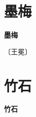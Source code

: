 \documentclass[12pt,UTF-8,openany,fontset=none]{ctexbook}
\begin{document}
\vspace{8pt}
\clearpage


\section{墨梅}



\begin{center}
    {\bfseries 墨梅}
\end{center}

\begin{center}
    \vspace{10pt}
    
    \begin{large}
        
        〔王冕〕
        
    \end{large}
    
    \vspace{8pt}
    
    \begin{huge}
        
        \phantom{。}

        \phantom{。}
        
        \phantom{。}

        \phantom{。}
        
    \end{huge}
    
\end{center}

\vspace{8pt}
\clearpage


\section{竹石}



\begin{center}
    {\bfseries 竹石}
\end{center}
\end{document}
